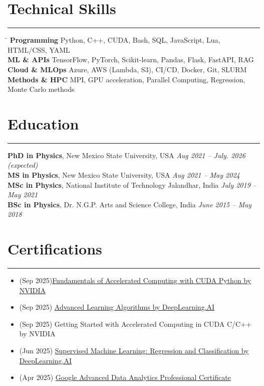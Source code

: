 \documentclass[11pt]{article}
\begin{document}
\section*{Technical Skills}
\hrule
\vspace{-0.3em}
\begin{tabbing}
\hspace{3.5cm} \= \kill
\textbf{Programming} \> Python, C++, CUDA, Bash, SQL, JavaScript, Lua, HTML/CSS, YAML \\
\textbf{ML \& APIs} \> TensorFlow, PyTorch, Scikit-learn, Pandas, Flask, FastAPI, RAG\\
\textbf{Cloud \& MLOps} \> Azure, AWS (Lambda, S3), CI/CD, Docker, Git, SLURM\\
\textbf{Methods \& HPC} \> MPI, GPU acceleration, Parallel Computing, Regression, Monte Carlo methods
\end{tabbing}

\section*{Education}
\hrule
\vspace{0.3em}

\textbf{PhD in Physics}, New Mexico State University, USA \hfill \textit{Aug 2021 – July. 2026 (expected)} \\
\textbf{MS in Physics}, New Mexico State University, USA \hfill \textit{Aug 2021 – May 2024} \\
\textbf{MSc in Physics}, National Institute of Technology Jalandhar, India \hfill \textit{July 2019 – May 2021} \\
\textbf{BSc in Physics}, Dr. N.G.P. Arts and Science College, India \hfill \textit{June 2015 – May 2018}


\section*{Certifications}
\hrule
\vspace{-0.3em}
\begin{itemize}
    \item (Sep 2025)\href{https://learn.nvidia.com/certificates?id=mMWLgny_SEC5DgHXY9XYEw}{Fundamentals of Accelerated Computing with CUDA Python by NVIDIA} 
    \item (Sep 2025) \href{https://www.coursera.org/account/accomplishments/verify/XG3YT41S0PF5}{Advanced Learning Algorithms by DeepLearning.AI} 
    \item (Sep 2025) Getting Started with Accelerated Computing in CUDA C/C++ by NVIDIA
    \item (Jun 2025) \href{https://coursera.org/share/b9cffe9c5ba5832ffb99bf7abdd8c384}{Supervised Machine Learning: Regression and Classification by DeepLearning.AI} 
    \item (Apr 2025) \href{https://www.coursera.org/account/accomplishments/professional-cert/certificate/U0HU8UKT89L4}{Google Advanced Data Analytics Professional Certificate} 
\end{itemize}
\end{document}
